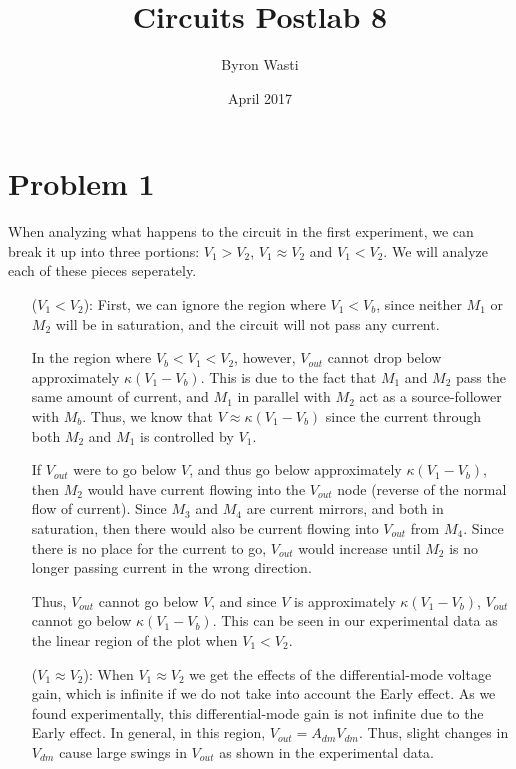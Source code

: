 \documentclass{article}
\title{Circuits Postlab 8}
\author{Byron Wasti}
\date{April 2017}
\begin{document}
\maketitle

\section{Problem 1}

When analyzing what happens to the circuit in the first experiment, we can break it up into three portions: $V_1 > V_2$, $V_1 \approx V_2$ and $V_1 < V_2$. We will analyze each of these pieces seperately.

\begin{itemize}

    \item [($V_1 < V_2$):]
        First, we can ignore the region where $V_1 < V_b$, since neither $M_1$ or $M_2$ will be in saturation, and the circuit will not pass any current. 
        
        In the region where $V_b < V_1 < V_2$, however, $V_{out}$ cannot drop below approximately $\kappa(V_1 -V_b)$. This is due to the fact that $M_1$ and $M_2$ pass the same amount of current, and $M_1$ in parallel with $M_2$ act as a source-follower with $M_b$. Thus, we know that $V \approx \kappa(V_1 - V_b)$ since the current through both $M_2$ and $M_1$ is controlled by $V_1$.

        If $V_{out}$ were to go below $V$, and thus go below approximately $\kappa(V_1 - V_b)$, then $M_2$ would have current flowing into the $V_{out}$ node (reverse of the normal flow of current). Since $M_3$ and $M_4$ are current mirrors, and both in saturation, then there would also be current flowing into $V_{out}$ from $M_4$. Since there is no place for the current to go, $V_{out}$ would increase until $M_2$ is no longer passing current in the wrong direction.

        Thus, $V_{out}$ cannot go below $V$, and since $V$ is approximately $\kappa(V_1 - V_b)$, $V_{out}$ cannot go below $\kappa(V_1 - V_b)$. This can be seen in our experimental data as the linear region of the plot when $V_1 < V_2$.

    \item [($V_1 \approx V_2$):] 
        When $V_1 \approx V_2$ we get the effects of the differential-mode voltage gain, which is infinite if we do not take into account the Early effect. As we found experimentally, this differential-mode gain is not infinite due to the Early effect. In general, in this region, $V_{out} = A_{dm} V_{dm}$. Thus, slight changes in $V_{dm}$ cause large swings in $V_{out}$ as shown in the experimental data.


\end{itemize}
\end{document}
